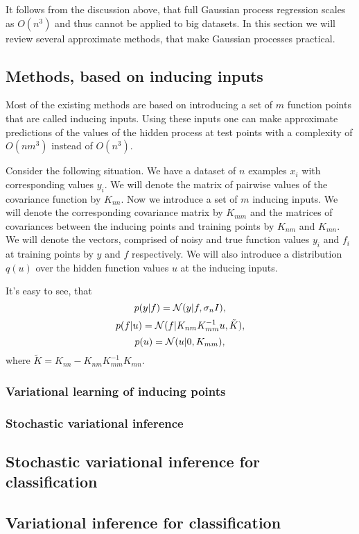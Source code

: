 It follows from the discussion above, that full Gaussian process regression scales as $O(n^3)$ and thus cannot be applied to big datasets. In this section we will review several approximate methods, that make Gaussian processes practical.

\subsection{Methods, based on inducing inputs}
	Most of the existing methods are based on introducing a set of $m$ function points that are called inducing inputs. Using these inputs one can make approximate predictions of the values of the hidden process at test points with a complexity of $O(nm^3)$ instead of $O(n^3)$.
	
	Consider the following situation. We have a dataset of $n$ examples $x_i$ with corresponding values $y_i$. We will denote the matrix of pairwise values of the covariance function by $K_{nn}$. Now we introduce a set of $m$ inducing inputs. We will denote the corresponding covariance matrix by $K_{mm}$ and the matrices of covariances between the inducing points and training points by $K_{nm}$ and $K_{mn}$. We will denote the vectors, comprised of noisy and true function values $y_i$ and $f_i$ at training points by $y$ and $f$ respectively. We will also introduce a distribution $q(u)$ over the hidden function values $u$ at the inducing inputs.
	
	It's easy to see, that
	$$p(y|f) = \mathcal{N} (y|f, \sigma_n I),$$
	$$p(f|u) = \mathcal{N} (f|K_{nm} K_{mm}^{-1}u, \tilde K),$$
	$$p(u) = \mathcal{N}(u|0, K_{mm}),$$
	where $\tilde K = K_{nn} - K_{nm} K_{mm}^{-1} K_{mn}.$
		
	\subsubsection{Variational learning of inducing points}
		

	\pagebreak
	\subsubsection{Stochastic variational inference}
		

	\subsection{Stochastic variational inference for classification}
		

	\subsection{Variational inference for classification}
		